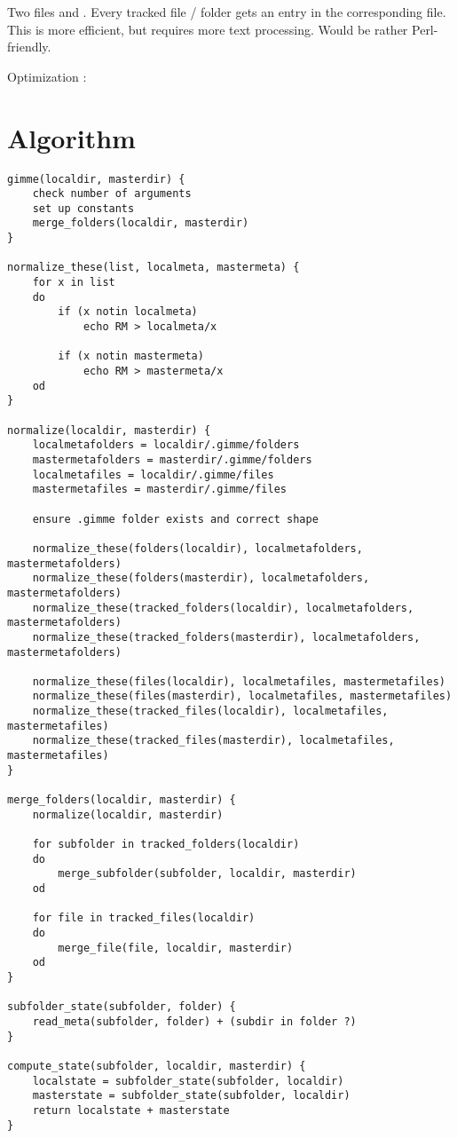 \documentclass[10pt,a4paper]{article}
\begin{document}
Two files  and . Every tracked file / folder gets an entry in the corresponding file. This is more efficient, but requires more text processing. Would be rather Perl-friendly.

Optimization : 

\section{Algorithm}

\begin{lstlisting}[frame=ltbr, tabsize=4]
gimme(localdir, masterdir) {
	check number of arguments
	set up constants
	merge_folders(localdir, masterdir)
}

normalize_these(list, localmeta, mastermeta) {
	for x in list
	do
		if (x notin localmeta)
			echo RM > localmeta/x
			
		if (x notin mastermeta)
			echo RM > mastermeta/x
	od
}

normalize(localdir, masterdir) {
	localmetafolders = localdir/.gimme/folders
	mastermetafolders = masterdir/.gimme/folders
	localmetafiles = localdir/.gimme/files
	mastermetafiles = masterdir/.gimme/files
	
	ensure .gimme folder exists and correct shape

	normalize_these(folders(localdir), localmetafolders, mastermetafolders)
	normalize_these(folders(masterdir), localmetafolders, mastermetafolders)
	normalize_these(tracked_folders(localdir), localmetafolders, mastermetafolders)
	normalize_these(tracked_folders(masterdir), localmetafolders, mastermetafolders)
	
	normalize_these(files(localdir), localmetafiles, mastermetafiles)
	normalize_these(files(masterdir), localmetafiles, mastermetafiles)
	normalize_these(tracked_files(localdir), localmetafiles, mastermetafiles)
	normalize_these(tracked_files(masterdir), localmetafiles, mastermetafiles)
}

merge_folders(localdir, masterdir) {
	normalize(localdir, masterdir)
	
	for subfolder in tracked_folders(localdir)
	do
		merge_subfolder(subfolder, localdir, masterdir)
	od
	
	for file in tracked_files(localdir)
	do
		merge_file(file, localdir, masterdir)
	od
}

subfolder_state(subfolder, folder) {
	read_meta(subfolder, folder) + (subdir in folder ?)
}

compute_state(subfolder, localdir, masterdir) {
	localstate = subfolder_state(subfolder, localdir)
	masterstate = subfolder_state(subfolder, localdir)
	return localstate + masterstate
}
	

\end{lstlisting}
\end{document}
